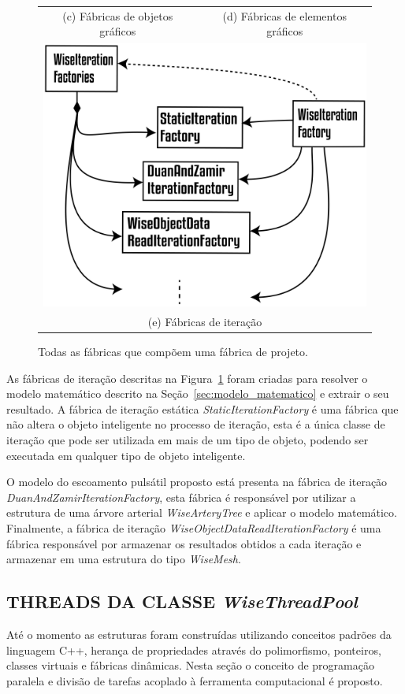 \begin{figure}
\begin{tabularx}{\textwidth}{cc}
		(c) Fábricas de objetos gráficos & (d) Fábricas de elementos gráficos \\[6pt]
		\multicolumn{2}{c}{\includegraphics[width=0.5\linewidth]{Figures/WiseIterationFactories@16x.png} }\\
		\multicolumn{2}{c}{(e) Fábricas de iteração}
	\end{tabularx}
	\caption{Todas as fábricas que compõem uma fábrica de projeto.}
	\label{tab:factories} 
\end{figure}

 As fábricas de iteração descritas na Figura~\ref{tab:factories} foram criadas para resolver o modelo matemático descrito na Seção~\ref{sec:modelo_matematico} e extrair o seu resultado. A fábrica de iteração estática \textit{StaticIterationFactory} é uma fábrica que não altera o objeto inteligente no processo de iteração, esta é a única classe de iteração que pode ser utilizada em mais de um tipo de objeto, podendo ser executada em qualquer tipo de objeto inteligente.

O modelo do escoamento pulsátil proposto está presenta na fábrica de iteração \textit{DuanAndZamirIterationFactory}, esta fábrica é responsável por utilizar a estrutura de uma árvore arterial \textit{WiseArteryTree} e aplicar o modelo matemático. Finalmente, a fábrica de iteração \textit{WiseObjectDataReadIterationFactory} é uma fábrica responsável por armazenar os resultados obtidos a cada iteração e armazenar em uma estrutura do tipo \textit{WiseMesh}.

\subsection{THREADS DA CLASSE \textit{WiseThreadPool}}\label{sec:threads}

Até o momento as estruturas foram construídas utilizando conceitos padrões da linguagem C++, herança de propriedades através do polimorfismo, ponteiros, classes virtuais e fábricas dinâmicas. Nesta seção o conceito de programação paralela e divisão de tarefas acoplado à ferramenta computacional é proposto.

